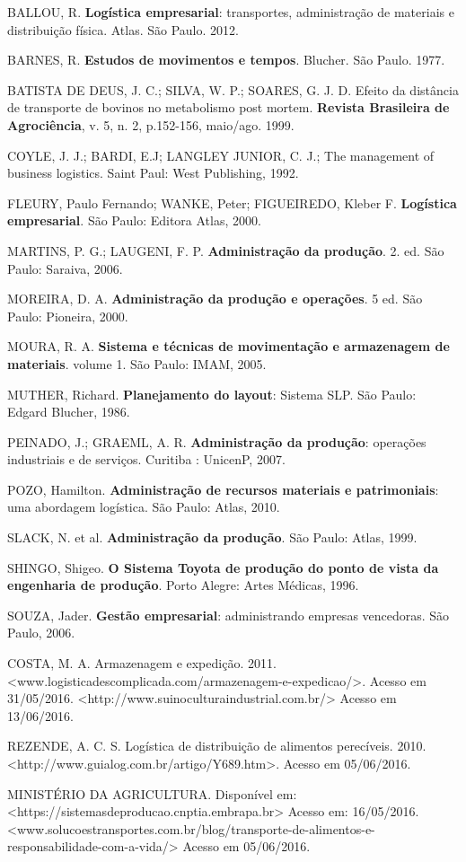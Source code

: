 \documentclass[article,12pt,oneside,a4paper,english,brazil]{unifil}
\begin{document}
\begin{thebibliography}{99}

\bibitem{}
{BALLOU, R. \textbf{Logística empresarial}: transportes, administração de materiais e distribuição física. Atlas. São Paulo. 2012. }

\bibitem{}
{BARNES, R. \textbf{Estudos de movimentos e tempos}. Blucher. São Paulo. 1977. }

\bibitem{}
{BATISTA DE DEUS, J. C.; SILVA, W. P.; SOARES, G. J. D. Efeito da distância de transporte de bovinos no metabolismo post mortem. \textbf{Revista Brasileira de Agrociência}, v. 5, n. 2, p.152-156, maio/ago. 1999. }

\bibitem{}
{COYLE, J. J.; BARDI, E.J; LANGLEY JUNIOR, C. J.; The management of business logistics. Saint Paul: West Publishing, 1992. }

\bibitem{}
{FLEURY, Paulo Fernando; WANKE, Peter; FIGUEIREDO, Kleber F. \textbf{Logística empresarial}. São Paulo: Editora Atlas, 2000. }

\bibitem{}
{MARTINS, P. G.; LAUGENI, F. P. \textbf{Administração da produção}. 2. ed. São Paulo: Saraiva, 2006. }

\bibitem{}
{MOREIRA, D. A. \textbf{Administração da produção e operações}. 5 ed. São Paulo: Pioneira, 2000. }

\bibitem{}
{MOURA, R. A. \textbf{Sistema e técnicas de movimentação e armazenagem de materiais}. volume 1. São Paulo: IMAM, 2005. }

\bibitem{}
{MUTHER, Richard. \textbf{Planejamento do layout}: Sistema SLP. São Paulo: Edgard Blucher, 1986. }

\bibitem{}
{PEINADO, J.; GRAEML, A. R. \textbf{Administração da produção}: operações industriais e de serviços. Curitiba : UnicenP, 2007. }

\bibitem{}
{POZO, Hamilton. \textbf{Administração de recursos materiais e patrimoniais}: uma abordagem logística. São Paulo: Atlas, 2010. }

\bibitem{}
{SLACK, N. et al. \textbf{Administração da produção}. São Paulo: Atlas, 1999. }

\bibitem{}
{SHINGO, Shigeo. \textbf{O Sistema Toyota de produção do ponto de vista da engenharia de produção}. Porto Alegre: Artes Médicas, 1996. }

\bibitem{}
{SOUZA, Jader. \textbf{Gestão empresarial}: administrando empresas vencedoras. São Paulo, 2006. }

\bibitem{}
{COSTA, M. A. Armazenagem e expedição. 2011. <www.logisticadescomplicada.com/armazenagem-e-expedicao/>. Acesso em 31/05/2016. <http://www.suinoculturaindustrial.com.br/> Acesso em 13/06/2016. }

\bibitem{}
{REZENDE, A. C. S. Logística de distribuição de alimentos perecíveis. 2010. <http://www.guialog.com.br/artigo/Y689.htm>. Acesso em 05/06/2016. }

\bibitem{}
{MINISTÉRIO DA AGRICULTURA. Disponível em: <https://sistemasdeproducao.cnptia.embrapa.br> Acesso em: 16/05/2016. <www.solucoestransportes.com.br/blog/transporte-de-alimentos-e-responsabilidade-com-a-vida/> Acesso em 05/06/2016.}

\end{thebibliography}
\end{document}
